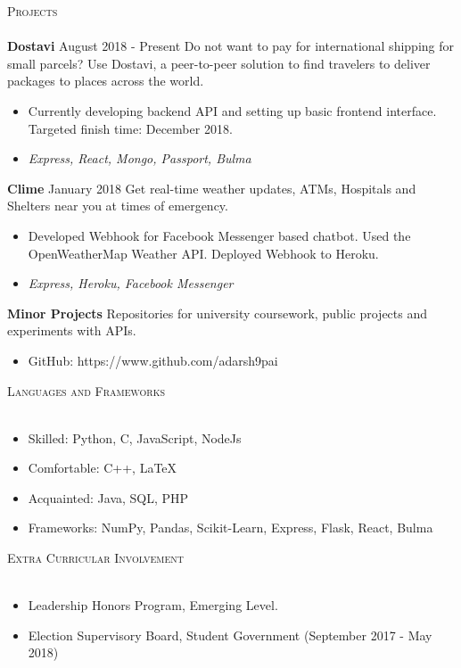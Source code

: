 \documentclass[a4paper]{article}
\newcommand{\lineunder} {
    \vspace*{-8pt} \\
    \hspace*{-18pt} \hrulefill \\
}
\newcommand{\header} [1] {
    {\hspace*{-18pt}\vspace*{6pt} \textsc{#1}}
    \vspace*{-6pt} \lineunder
}
\begin{document}
\vspace{2mm}

\header{Projects}
{\textbf{Dostavi}} August 2018 - Present \hspace{1mm} Do not want to pay for international shipping for small parcels? Use Dostavi, a peer-to-peer solution to find travelers to deliver packages to places across the world. 
\begin{itemize}
\item Currently developing backend API and setting up basic frontend interface. Targeted finish time: December 2018.
\item \textit{Express, React, Mongo, Passport, Bulma} 
\end{itemize}
\vspace*{2mm}
{\textbf{Clime}} January 2018 \hspace{1mm} Get real-time weather updates, ATMs, Hospitals and Shelters near you at times of emergency.
\begin{itemize}
\item Developed Webhook for Facebook Messenger based chatbot. Used the OpenWeatherMap Weather API. Deployed Webhook to Heroku.
\item \textit{Express, Heroku, Facebook Messenger}
\end{itemize}
\textbf{Minor Projects} Repositories for university coursework, public projects and experiments with APIs. 
\begin{itemize}
\item GitHub: https://www.github.com/adarsh9pai
\end{itemize}
\vspace{2mm}

\header{Languages and Frameworks}
\begin{itemize}
\item Skilled: Python, C, JavaScript, NodeJs
\item Comfortable: C++, \LaTeX
\item Acquainted: Java, SQL, PHP
\item Frameworks: NumPy, Pandas, Scikit-Learn, Express, Flask, React, Bulma
\end{itemize}

\vspace{2mm}

\header{Extra Curricular Involvement}
\begin{itemize}
\item Leadership Honors Program, Emerging Level.
\item Election Supervisory Board, Student Government (September 2017 - May 2018)
\end{itemize}
\vspace{1mm}
\end{document}
